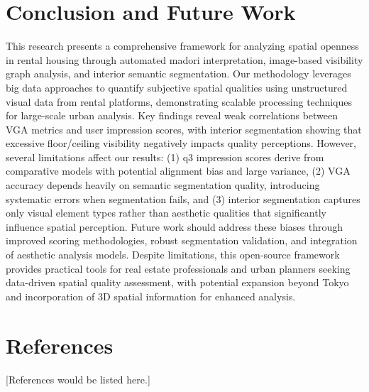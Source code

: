\documentclass[11pt,a4paper]{article}
\begin{document}
\begin{multicols}{2}
\section{Conclusion and Future Work}

This research presents a comprehensive framework for analyzing spatial openness in rental housing through automated madori
interpretation, image-based visibility graph analysis, and interior semantic segmentation. Our methodology leverages big data
approaches to quantify subjective spatial qualities using unstructured visual data from rental platforms, demonstrating
scalable processing techniques for large-scale urban analysis. Key findings reveal weak correlations between VGA metrics and
user impression scores, with interior segmentation showing that excessive floor/ceiling visibility negatively impacts quality
perceptions. However, several limitations affect our results: (1) q3 impression scores derive from comparative models with
potential alignment bias and large variance, (2) VGA accuracy depends heavily on semantic segmentation quality, introducing
systematic errors when segmentation fails, and (3) interior segmentation captures only visual element types rather than
aesthetic qualities that significantly influence spatial perception. Future work should address these biases through improved
scoring methodologies, robust segmentation validation, and integration of aesthetic analysis models. Despite limitations, this
open-source framework provides practical tools for real estate professionals and urban planners seeking data-driven spatial
quality assessment, with potential expansion beyond Tokyo and incorporation of 3D spatial information for enhanced analysis.

\section{References}

[References would be listed here.]

\end{multicols}

\newpage

\begin{multicols}{2}
\fontsize{11}{13}\selectfont


\end{multicols}

\newpage

\begin{multicols}{2}
\fontsize{11}{13}\selectfont


\end{multicols}
\end{document}
